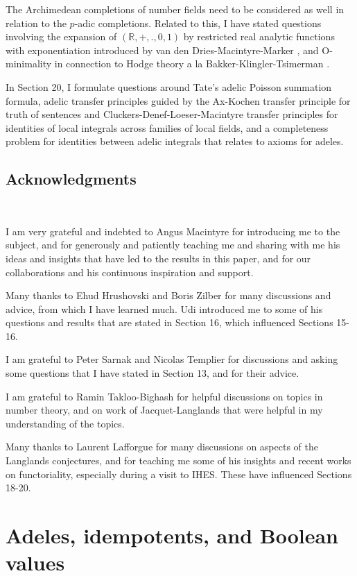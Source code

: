 \documentclass[12pt]{amsart}
\def\R{\mathbb{R}}
\def\R{\mathbb{R}}
\numberwithin{equation}{section}
\begin{document}
The Archimedean completions of number fields need to be considered as well in relation to the $p$-adic completions. Related to this, I have stated questions involving the expansion of $(\R,+,.,0,1)$ by 
restricted real analytic functions with exponentiation introduced by 
van den Dries-Macintyre-Marker \cite{VMM}, and O-minimality in connection to Hodge theory a la Bakker-Klingler-Tsimerman \cite{BKT}. 

In Section 20, I  formulate questions around Tate's adelic Poisson summation formula, adelic transfer principles guided by the Ax-Kochen transfer principle for truth of sentences and Cluckers-Denef-Loeser-Macintyre transfer principles 
for identities of local integrals across 
families of local fields, and a completeness problem for identities between adelic integrals that relates to axioms for adeles.

\medskip

\subsection{\bf Acknowledgments}

\

\medskip

I am very grateful and indebted to Angus Macintyre for introducing me to the subject, and for generously and patiently teaching me and sharing with me his ideas and insights that have led to the results in this paper, and for our collaborations and his continuous inspiration and support.

Many thanks to Ehud Hrushovski and Boris Zilber for many discussions and advice, from which I have learned much. Udi introduced me to some of his questions and results that are stated in Section 16, which influenced Sections 15-16.

I am grateful to Peter Sarnak and Nicolas Templier for discussions and asking some questions that I have stated in Section 13, and for their advice.

I am grateful to Ramin Takloo-Bighash for helpful discussions on topics in number theory, and on work of Jacquet-Langlands that were helpful in my understanding of the topics.

Many thanks to Laurent Lafforgue for many discussions on aspects of the Langlands conjectures, and for teaching me some of his insights and recent works on functoriality, especially during a visit to IHES. These have influenced Sections 18-20. 


\section{\bf Adeles, idempotents, and Boolean values}\label{sec-basic}
\end{document}
